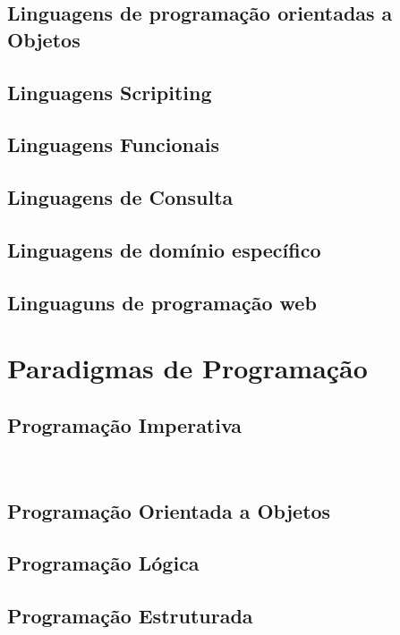 \documentclass[tcc/ec]{faeng}
\begin{document}
\subsection{Linguagens de programação orientadas a Objetos}

\subsection{Linguagens Scripiting}

\subsection{Linguagens Funcionais}

\subsection{Linguagens de Consulta}

\subsection{Linguagens de domínio específico}

\subsection{Linguaguns de programação web}

\section{Paradigmas de Programação}

\subsection{Programação Imperativa}\

\subsection{Programação Orientada a Objetos}

\subsection{Programação Lógica}

\subsection{Programação Estruturada}
\end{document}
